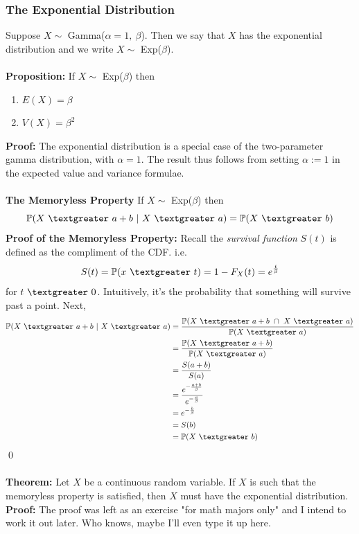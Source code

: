 \documentclass{article}
\newcommand{\ti}[1]{\textit{#1}}
\newcommand{\bbP}{\mathbb{P}}
\newcommand{\gt}{\textgreater}
\newcommand{\al}{\alpha}
\newcommand{\be}{\beta}
\begin{document}
\subsubsection{The Exponential Distribution}
Suppose $X \sim$ Gamma($\al =1,\ \be$). Then we say that $X$ has the exponential distribution and we write $X \sim$ Exp($\be$).\\\\
\textbf{Proposition:} If $X \sim$ Exp($\be$) then
\begin{enumerate}
	\item $E(X) = \be$
	\item $V(X) = \be^{2}$
\end{enumerate}
\textbf{Proof:} The exponential distribution is a special case of the two-parameter gamma distribution, with $\al =1$. The result thus follows from setting $\al :=1$ in the expected value and variance formulae.\\\\
\textbf{The Memoryless Property}
If $X \sim$ Exp($\be$) then
\[\bbP(X\ \gt\ a+b\ |\ X\ \gt\ a) = \bbP(X\ \gt\ b)\]
\textbf{Proof of the Memoryless Property:} Recall the \ti{survival function} $S(t)$ is defined as the compliment of the CDF. i.e.
\[S(t) = \bbP(x\ \gt\ t) = 1-F_{X}(t) = e^{\frac{t}{\be}}\]
for $t\ \gt\ 0$. Intuitively, it's the probability that something will survive past a point. Next,
\begin{align*}
	\bbP(X\ \gt\ a+b\ |\ X\ \gt\ a) &= \frac{\bbP(X\ \gt\ a+b\ \cap\ X\ \gt\ a)}{\bbP(X\ \gt\ a)}\\
							&= \frac{\bbP(X\ \gt\ a+b)}{\bbP(X\ \gt\ a)}\\
							&= \frac{S(a+b)}{S(a)}\\
							&= \frac{e^{-\frac{a+b}{\be}}}{e^{-\frac{a}{\be}}}\\
							&= e^{-\frac{b}{\be}}\\
							&= S(b)\\
							&= \bbP(X\ \gt\ b)
\end{align*}
\qed\\\\
\textbf{Theorem:} Let $X$ be a continuous random variable. If $X$ is such that the memoryless property is satisfied, then $X$ must have the exponential distribution.\\
\textbf{Proof:} The proof was left as an exercise "for math majors only" and I intend to work it out later. Who knows, maybe I'll even type it up here.
\end{document}
